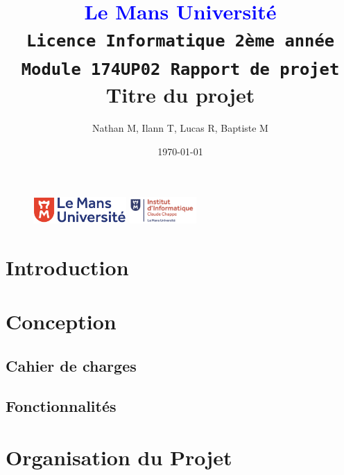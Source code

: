 \documentclass[11pt]{article}
\begin{document}
\begin{figure}
    \includegraphics[height=1cm]{logolemansU.png}
    \hfill
    \includegraphics[height=1cm]{logo_IC2.png}
\end{figure}
    \title { 
        \textcolor{blue}{Le Mans Université} \\
        \texttt{Licence Informatique 2ème année} \\
        \texttt{Module 174UP02 Rapport de projet}\\
        \textbf{Titre du projet}
    }
    
    \author{Nathan M, Ilann T, Lucas R, Baptiste M} 
    \date{\today} 
    \maketitle
    

    \newpage
    \tableofcontents
    
    \section{Introduction}
    
    \section{Conception}

        \subsection{Cahier de charges}

        \subsection{Fonctionnalités} 
    
    \section{Organisation du Projet}
\end{document}
